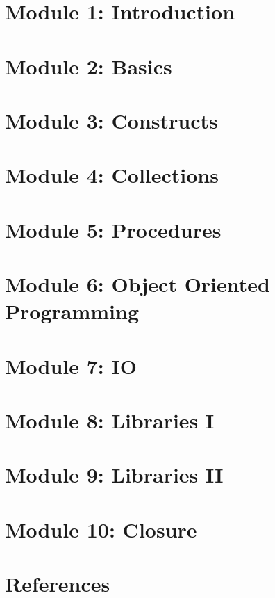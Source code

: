 \section[Intro]{Module 1: Introduction}



\section[Basics]{Module 2: Basics}



 
\section[Constructs]{Module 3: Constructs}



\section[Seq]{Module 4: Collections}


  
\section[Procedures]{Module 5: Procedures}


 
\section[OOP]{Module 6: Object Oriented Programming}

 
\section[IO]{Module 7: IO}

 
\section[LibI]{Module 8: Libraries I}


 
\section[LibII]{Module 9: Libraries II}

%
 
\section[End]{Module 10: Closure}



 
\section[Refs]{References}


